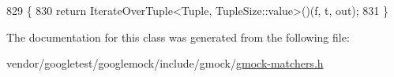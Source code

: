 \begin{DoxyCode}
829                                                           \{
830     \textcolor{keywordflow}{return} IterateOverTuple<Tuple, TupleSize::value>()(f, t, out);
831   \}
\end{DoxyCode}


The documentation for this class was generated from the following file\+:\begin{DoxyCompactItemize}
\item 
vendor/googletest/googlemock/include/gmock/\hyperlink{gmock-matchers_8h}{gmock-\/matchers.\+h}\end{DoxyCompactItemize}
